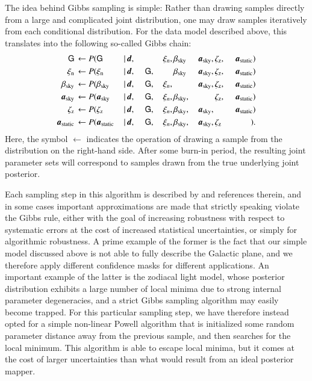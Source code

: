 \documentclass{aa}
\newcommand{\dv}[0]{\vec{d}}
\newcommand{\G}[0]{\tens{G}}
\renewcommand{\a}[0]{\vec{a}}
\begin{document}
The idea behind Gibbs sampling is simple: Rather than drawing samples
directly from a large and complicated joint distribution, one may
draw samples iteratively from each conditional distribution. For the
data model described above, this translates into the following
so-called Gibbs chain:
\begin{alignat}{11}
\G &\,\leftarrow P(\G&\,\mid &\,\dv,&\, &\,\phantom{\G} &\,\xi_n, &
\,\beta_{\mathrm{sky}}& \,\a_{\mathrm{sky}}, &\,\zeta_{\mathrm{z}},
&\,\a_{\mathrm{static}})\label{eq:gibbs_G}\\
\xi_{\mathrm{n}} &\,\leftarrow P(\xi_{\mathrm{n}}&\,\mid &\,\dv,&\, &\,\G, &\,\phantom{\xi_n} &
\,\beta_{\mathrm{sky}}& \,\a_{\mathrm{sky}}, &\,\zeta_{\mathrm{z}},
&\,\a_{\mathrm{static}})\\
\beta_{\mathrm{sky}} &\,\leftarrow P(\beta_{\mathrm{sky}}&\,\mid &\,\dv,&\, &\,\G, &\,\xi_n, &
\,\phantom{\beta_{\mathrm{sky}}}& \,\a_{\mathrm{sky}}, &\,\zeta_{\mathrm{z}}, &\,\a_{\mathrm{static}})\\
\a_{\mathrm{sky}} &\,\leftarrow P(\a_{\mathrm{sky}}&\,\mid &\,\dv,&\, &\,\G, &\,\xi_n, &
\,\beta_{\mathrm{sky}},& \,\phantom{\a_{\mathrm{sky}},}
&\,\zeta_{\mathrm{z}}, &\,\a_{\mathrm{static}})\\
\zeta_{\mathrm{z}} &\,\leftarrow P(\zeta_{\mathrm{z}}&\,\mid &\,\dv,&\, &\,\G, &\,\xi_n, &
\,\beta_{\mathrm{sky}},& \,\a_{\mathrm{sky}},
&\,\phantom{\zeta_{\mathrm{z}},} &\,\a_{\mathrm{static}})\label{eq:gibbs_zodi}\\
\a_{\mathrm{static}} &\,\leftarrow P(\a_{\mathrm{static}}&\,\mid &\,\dv,&\, &\,\G, &\,\xi_n, &
\,\beta_{\mathrm{sky}},& \,\a_{\mathrm{sky}}, &\,\zeta_{\mathrm{z}} &\,\phantom{\a_{\mathrm{static}}})\label{eq:gibbs_static}.
\end{alignat}
Here, the symbol $\leftarrow$ indicates the operation of drawing a
sample from the distribution on the right-hand side. After some
burn-in period, the resulting joint parameter sets will correspond to
samples drawn from the true underlying joint posterior.


Each sampling step in this algorithm is described by \citet{CG02_01}
and references therein, and in some cases important 
approximations are made that strictly speaking violate the Gibbs
rule, either with the goal of increasing robustness with respect to
systematic errors at the cost of increased statistical uncertainties,
or simply for algorithmic robustness. A prime example of the former is
the fact that our simple model discussed above is not able to fully
describe the Galactic plane, and we therefore apply different
confidence masks for different applications. An important example of
the latter is the zodiacal light model, whose posterior distribution
exhibits a large number of local minima due to strong internal
parameter degeneracies, and a strict Gibbs sampling algorithm may
easily become trapped. For this particular sampling step, we have
therefore instead opted for a simple non-linear Powell algorithm that
is initialized some random parameter distance away from the previous
sample, and then searches for the local minimum. This algorithm is
able to escape local minima, but it comes at the cost of larger
uncertainties than what would result from an ideal posterior mapper.
\end{document}
